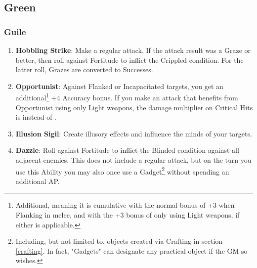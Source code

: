 \subsection{Green}

\subsubsection{Guile}
\begin{enumerate}
    \item \textbf{Hobbling Strike}: Make a regular attack. If the attack result was a Graze or better, then roll against Fortitude to inflict the Crippled condition. For the latter roll, Grazes are converted to Successes.
    \item \textbf{Opportunist}: Against Flanked or Incapacitated targets, you get an additional\footnote{Additional, meaning it is cumulative with the normal bonus of +3 when Flanking in melee, and with the +3 bonus of only using Light weapons, if either is applicable.} +4 Accuracy bonus. If you make an attack that benefits from Opportunist using only Light weapons, the damage multiplier on Critical Hits is  instead of .
    \item \textbf{Illusion Sigil}: Create illusory effects and influence the minds of your targets.
    \item \textbf{Dazzle}: Roll against Fortitude to inflict the Blinded condition against all adjacent enemies. This does not include a regular attack, but on the turn you use this Ability you may also once use a Gadget\footnote{Including, but not limited to, objects created via Crafting in section \ref{crafting}. In fact, "Gadgets" can designate any practical object if the GM so wishes.} without spending an additional AP.
\end{enumerate}

